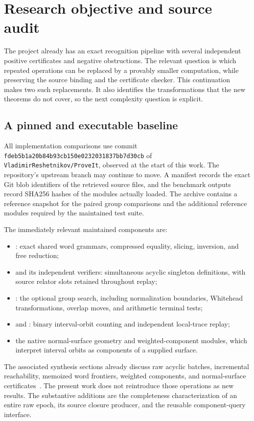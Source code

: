 \section{Research objective and source audit}
\label{sec:background}

The project already has an exact recognition pipeline with several
independent positive certificates and negative obstructions. The relevant
question is which repeated operations can be replaced by a provably smaller
computation, while preserving the source binding and the certificate
checker. This continuation makes two such replacements. It also identifies
the transformations that the new theorems do not cover, so the next
complexity question is explicit.

\subsection{A pinned and executable baseline}

All implementation comparisons use commit
\texttt{fdeb5b1a20b84b93cb150e0232031837bb7d30cb}
of \texttt{VladimirReshetnikov/ProveIt}, observed at the start of this work.
The repository's upstream branch may continue to move. A manifest records
the exact Git blob identifiers of the retrieved source files, and the
benchmark outputs record SHA256 hashes of the modules actually loaded.
The archive contains a reference snapshot for the paired group comparisons
and the additional reference modules required by the maintained test suite.

The immediately relevant maintained components are:
\begin{itemize}
\item {}: exact shared word grammars,
  compressed equality, slicing, inversion, and free reduction;
\item {} and its independent verifiers:
  simultaneous acyclic singleton definitions, with source relator slots
  retained throughout replay;
\item {}: the optional group search, including
  normalization boundaries, Whitehead transformations, overlap moves,
  and arithmetic terminal tests;
\item {} and :
  binary interval-orbit counting and independent local-trace replay;
\item the native normal-surface geometry and weighted-component modules,
  which interpret interval orbits as components of a supplied surface.
\end{itemize}
The associated synthesis sections already discuss raw acyclic batches,
incremental reachability, memoized word frontiers, weighted components,
and normal-surface certificates~\cite{repo}. The present work does not
reintroduce those operations as new results. The substantive additions are
the completeness characterization of an entire raw epoch, its source
closure producer, and the reusable component-query interface.

